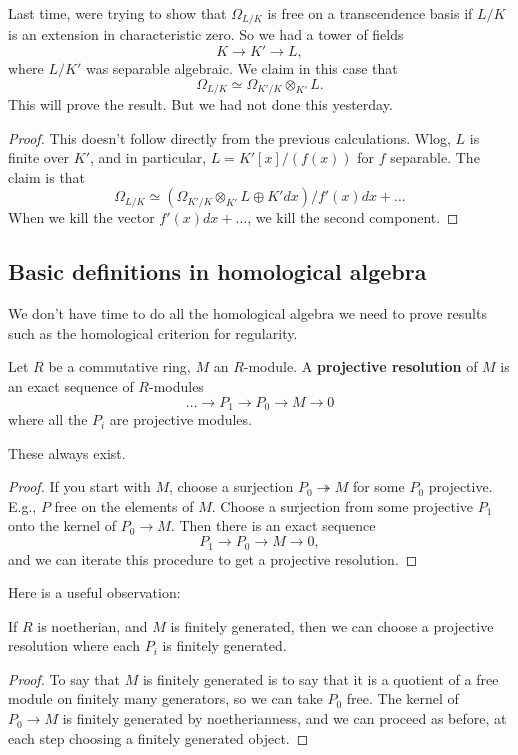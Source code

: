 Last time, were trying to show that $\Omega_{L/K}$ is free on a transcendence
basis if $L/K$ is an extension in characteristic zero. So we had a tower of fields
\[ K \to K' \to L,  \]
where $L/K'$ was separable algebraic. 
We claim in this case that
\[ \Omega_{L/K} \simeq \Omega_{K'/K} \otimes_{K'} L.  \]
This will prove the result. But we had not done this yesterday.
\begin{proof} 
This doesn't follow directly from the previous calculations. Wlog, $L$ is
finite over $K'$, and in particular, $L = K'[x]/(f(x))$ for $f$ separable. The claim is that
\[ \Omega_{L/K} \simeq (\Omega_{K'/K}\otimes_{K'}L \oplus K' dx)/f'(x)dx + \dots  \]
When we kill the vector $f'(x) dx + \dots$, we kill the second component. 
\end{proof} 


\subsection{Basic definitions in homological algebra}

We don't have time to do all the homological algebra we need to prove results
such as the homological criterion for regularity. 

\begin{definition} 
Let $R$ be a commutative ring, $M$ an $R$-module. A \textbf{projective resolution} of
$M$ is an exact sequence of $R$-modules
\[ \dots \to P_1 \to  P_0 \to M \to 0  \]
where all the $P_i$ are projective modules.
\end{definition} 


\begin{proposition} 
These always exist.
\end{proposition} 
\begin{proof} 
If you start with $M$, choose a surjection $P_0 \twoheadrightarrow M$ for some
$P_0$ projective. E.g., $P$ free on the elements of $M$. Choose a surjection
from some projective $P_1$ onto the kernel of $P_0 \to M$. Then there is an
exact sequence
\[ P_1 \to P_0 \to M \to 0,  \]
and we can iterate this procedure to get a projective resolution.
\end{proof} 

Here is a useful observation:
\begin{proposition} 
If $R$ is noetherian, and $M$ is finitely generated, then we can choose a
projective resolution where each $P_i$ is finitely generated. 
\end{proposition} 
\begin{proof} 
To say that $M$ is finitely generated is to say that it is a quotient of a free module on
finitely many generators, so we can take $P_0$ free. The kernel of $P_0 \to M$
is finitely generated by noetherianness, and we can proceed as before, at each step
choosing a finitely generated object. 
\end{proof} 


